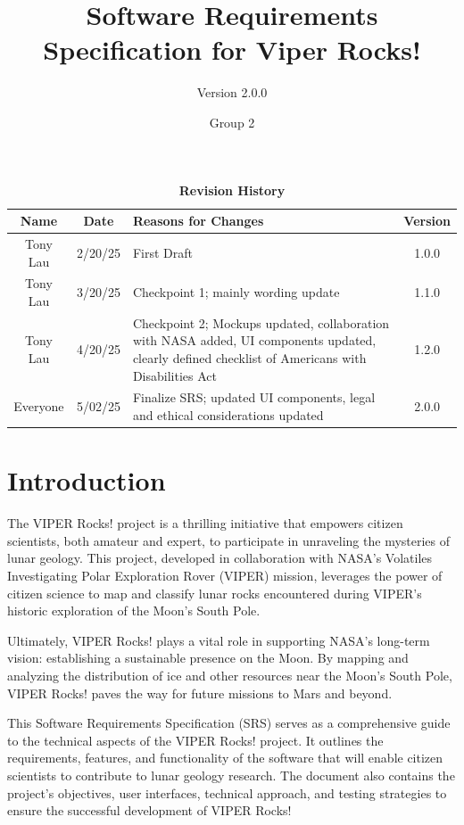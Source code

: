 \documentclass{article}
\begin{document}
\title{Software Requirements Specification for Viper Rocks!}
\author{Version 2.0.0}
\date{Group 2}

\maketitle
\tableofcontents
\newpage

\fancyhf{}
\fancyfoot[C]{\thepage}

\begin{table}[h!]
\centering
\caption{\textbf{Revision History}}
\begin{tabularx}{\textwidth}{|c|c|X|c|}
\hline
\textbf{Name} & \textbf{Date} & \textbf{Reasons for Changes} & \textbf{Version} \\
\hline
Tony Lau & 2/20/25 & First Draft & 1.0.0 \\
\hline
Tony Lau & 3/20/25 & Checkpoint 1; mainly wording update & 1.1.0 \\
\hline
Tony Lau & 4/20/25 & Checkpoint 2; Mockups updated, collaboration with NASA added, UI components updated, clearly defined checklist of Americans with Disabilities Act & 1.2.0 \\
\hline
Everyone & 5/02/25 & Finalize SRS; updated UI components, legal and ethical considerations updated & 2.0.0 \\
\hline
\end{tabularx}
\end{table}

\section{Introduction}
The VIPER Rocks! project is a thrilling initiative that empowers citizen scientists, both amateur and expert, to participate in unraveling the mysteries of lunar geology. This project, developed in collaboration with NASA's Volatiles Investigating Polar Exploration Rover (VIPER) mission, leverages the power of citizen science to map and classify lunar rocks encountered during VIPER's historic exploration of the Moon's South Pole.

Ultimately, VIPER Rocks! plays a vital role in supporting NASA's long-term vision: establishing a sustainable presence on the Moon. By mapping and analyzing the distribution of ice and other resources near the Moon's South Pole, VIPER Rocks! paves the way for future missions to Mars and beyond.

This Software Requirements Specification (SRS) serves as a comprehensive guide to the technical aspects of the VIPER Rocks! project. It outlines the requirements, features, and functionality of the software that will enable citizen scientists to contribute to lunar geology research. The document also contains the project's objectives, user interfaces, technical approach, and testing strategies to ensure the successful development of VIPER Rocks!
\end{document}
